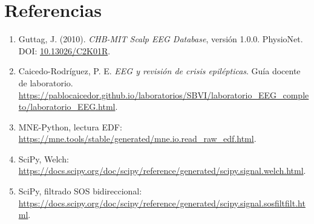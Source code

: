 \documentclass[11pt,a4paper]{article}
\begin{document}
\section{Referencias}
\begin{enumerate}[leftmargin=*]
\item Guttag, J. (2010). \textit{CHB-MIT Scalp EEG Database}, versión 1.0.0. PhysioNet. DOI: \href{https://doi.org/10.13026/C2K01R}{10.13026/C2K01R}.
\item Caicedo-Rodríguez, P. E. \textit{EEG y revisión de crisis epilépticas}. Guía docente de laboratorio. \url{https://pablocaicedor.github.io/laboratorios/SBVI/laboratorio_EEG_completo/laboratorio_EEG.html}.
\item MNE-Python, lectura EDF: \url{https://mne.tools/stable/generated/mne.io.read_raw_edf.html}.
\item SciPy, Welch: \url{https://docs.scipy.org/doc/scipy/reference/generated/scipy.signal.welch.html}.
\item SciPy, filtrado SOS bidireccional: \url{https://docs.scipy.org/doc/scipy/reference/generated/scipy.signal.sosfiltfilt.html}.
\end{enumerate}
\end{document}
